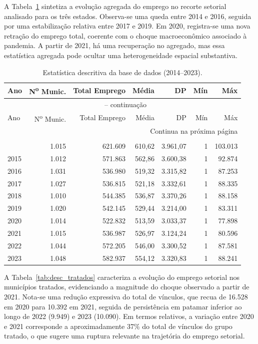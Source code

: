 \documentclass[12pt,a4paper]{article}
\begin{document}
A Tabela~\ref{tab:desc_geral} sintetiza a evolu\c{c}\~ao agregada do emprego no recorte setorial analisado para os tr\^es estados. Observa-se uma queda entre 2014 e 2016, seguida por uma estabiliza\c{c}\~ao relativa entre 2017 e 2019. Em 2020, registra-se uma nova retra\c{c}\~ao do emprego total, coerente com o choque macroecon\^omico associado \`a pandemia. A partir de 2021, h\'a uma recupera\c{c}\~ao no agregado, mas essa estat\'istica agrega\-da pode ocultar uma heterogeneidade espacial substantiva.

\begin{longtable}{@{}lrrrrrr@{}}
\caption{Estat\'istica descritiva da base de dados (2014--2023).}
\label{tab:desc_geral} \\
\toprule
Ano  & N\textsuperscript{o} Munic. & Total Emprego & M\'edia & DP & M\'in & M\'ax \\
\midrule
\endfirsthead
\multicolumn{7}{c}{{\tablename\ \thetable{} -- continua\c{c}\~ao}} \\
\toprule
Ano  & N\textsuperscript{o} Munic. & Total Emprego & M\'edia & DP & M\'in & M\'ax \\
\midrule
\endhead
\midrule
\multicolumn{7}{r}{{\footnotesize Continua na pr\'oxima p\'agina}} \\
\endfoot
\bottomrule
\multicolumn{7}{l}{\footnotesize Fonte: Elabora\c{c}\~ao pr\'opria com base nos dados da RAIS.}\\
\endlastfoot
2014 & 1.015 & 621.609 & 610,62 & 3.961,07 & 1 & 103.013 \\
2015 & 1.012 & 571.863 & 562,86 & 3.600,38 & 1 &  92.874 \\
2016 & 1.031 & 536.980 & 519,32 & 3.315,82 & 1 &  87.253 \\
2017 & 1.027 & 536.815 & 521,18 & 3.332,61 & 1 &  88.335 \\
2018 & 1.010 & 544.385 & 536,87 & 3.370,26 & 1 &  88.158 \\
2019 & 1.020 & 542.145 & 529,44 & 3.214,00 & 1 &  83.311 \\
2020 & 1.014 & 522.832 & 513,59 & 3.033,37 & 1 &  77.898 \\
2021 & 1.015 & 536.987 & 526,97 & 3.124,24 & 1 &  80.596 \\
2022 & 1.044 & 572.205 & 546,00 & 3.300,52 & 1 &  87.581 \\
2023 & 1.048 & 582.937 & 554,12 & 3.320,83 & 1 &  88.241 \\
\end{longtable}

A Tabela~\ref{tab:desc_tratados} caracteriza a evolu\c{c}\~ao do emprego setorial nos munic\'ipios tratados, evidenciando a magnitude do choque observado a partir de 2021. Nota-se uma redu\c{c}\~ao expressiva do total de v\'inculos, que recua de 16.528 em 2020 para 10.392 em 2021, seguida de persist\^encia em patamar inferior ao longo de 2022 (9.949) e 2023 (10.090). Em termos relativos, a varia\c{c}\~ao entre 2020 e 2021 corresponde a aproximadamente 37\% do total de v\'inculos do grupo tratado, o que sugere uma ruptura relevante na trajet\'oria do emprego setorial.
\end{document}
